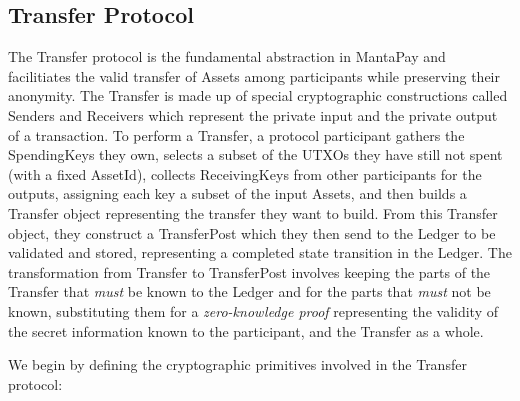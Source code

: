 \documentclass[a4paper]{article}
\newcommand{\lsubsection}[2]{\def\sectionlabel{#2} \subsection{#1}\label{sec:#2}}
\theoremstyle{definition}
\newcommand{\AssetId}{{\textsf{AssetId}}}
\newcommand{\Asset}{{\textsf{Asset}}}
\newcommand{\Ledger}{{\textsf{Ledger}}}
\newcommand{\MantaPay}{{\textsf{MantaPay}}}
\newcommand{\Receiver}{{\textsf{Receiver}}}
\newcommand{\ReceivingKey}{{\textsf{ReceivingKey}}}
\newcommand{\Sender}{{\textsf{Sender}}}
\newcommand{\SpendingKey}{{\textsf{SpendingKey}}}
\newcommand{\TransferPost}{{\textsf{TransferPost}}}
\newcommand{\Transfer}{{\textsf{Transfer}}}
\newcommand{\UTXO}{{\textsf{UTXO}}}
\begin{document}
\lsubsection{\Transfer{} Protocol}{transfer-protocol}

The \Transfer{} protocol is the fundamental abstraction in \MantaPay{} and facilitiates the valid transfer of \Asset{s} among participants while preserving their anonymity. The \Transfer{} is made up of special cryptographic constructions called \Sender{s} and \Receiver{s} which represent the private input and the private output of a transaction. To perform a \Transfer{}, a protocol participant gathers the \SpendingKey{s} they own, selects a subset of the \UTXO{s} they have still not spent (with a fixed \AssetId{}), collects \ReceivingKey{s} from other participants for the outputs, assigning each key a subset of the input \Asset{s}, and then builds a \Transfer{} object representing the transfer they want to build. From this \Transfer{} object, they construct a \TransferPost{} which they then send to the \Ledger{} to be validated and stored, representing a completed state transition in the \Ledger{}. The transformation from \Transfer{} to \TransferPost{} involves keeping the parts of the \Transfer{} that \emph{must} be known to the \Ledger{} and for the parts that \emph{must} not be known, substituting them for a \emph{zero-knowledge proof} representing the validity of the secret information known to the participant, and the \Transfer{} as a whole.

We begin by defining the cryptographic primitives involved in the \Transfer{} protocol:
\end{document}

